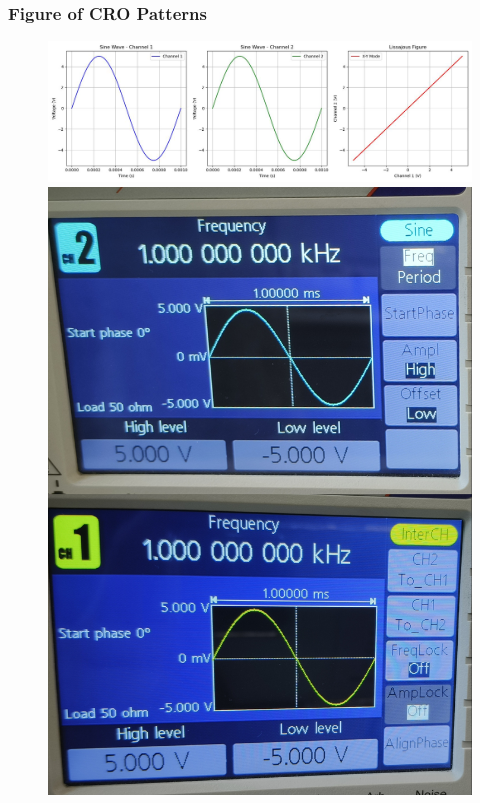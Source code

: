 \documentclass[12pt,a4paper]{report}
\begin{document}
\subsubsection*{Figure of CRO Patterns}
\begin{figure}[H] %
    \centering
    \includegraphics[width=\textwidth]{figs/1.jpg} %
    \begin{minipage}[c]{0.48\textwidth}
        \includegraphics[width=\textwidth]{figs/1read.jpg} %
        

\end{minipage}
\end{figure}
\end{document}

